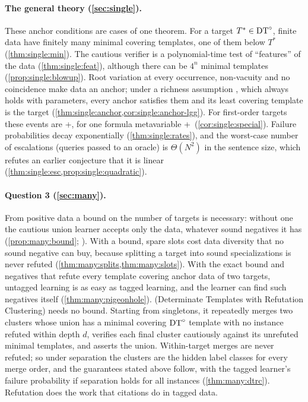 \paragraph{The general theory (\cref{sec:single}).}
These anchor conditions are cases of one theorem. For a target $T^*\in\mathrm{DT}^{\circ}$, finite data have finitely many minimal
covering templates, one of them below $T^*$ (\cref{thm:single:min}). The cautious verifier is a polynomial-time test of
``features'' of the data (\cref{thm:single:feat}), although there can be $4^n$ minimal templates
(\cref{prop:single:blowup}). Root variation at every occurrence, non-vacuity and no coincidence make data an anchor;
under a richness assumption \Rich, which always holds with parameters, every anchor satisfies them and its least
covering template is the target (\cref{thm:single:anchor,cor:single:anchor-lgg}). For first-order targets these events
are \evR+\evD, for one formula metavariable \evR+\evN\ (\cref{cor:single:special}). Failure probabilities decay
exponentially (\cref{thm:single:rates}), and the worst-case number of escalations (queries passed to an oracle) is
$\Theta(N^2)$ in the sentence size, which refutes an earlier conjecture that it is linear
(\cref{thm:single:esc,prop:single:quadratic}).

\paragraph{Question 3 (\cref{sec:many}).}
From positive data a bound on the number of targets is necessary: without one the cautious union learner accepts only
the data, whatever sound negatives it has (\cref{prop:many:bound}; \citealp{gold1967language}). With a bound, spare
slots cost data diversity that no sound negative can buy, because splitting a target into sound specializations is never
refuted (\cref{thm:many:splits,thm:many:slots}). With the exact bound and negatives that refute every template covering
anchor data of two targets, untagged learning is as easy as tagged learning, and the learner can find such negatives
itself (\cref{thm:many:pigeonhole}). \textup{\DTRC} (Determinate Templates with Refutation Clustering) needs no bound.
Starting from singletons, it repeatedly merges two clusters whose union has a minimal covering $\mathrm{DT}^{\circ}$ template with no
instance refuted within depth $d$, verifies each final cluster cautiously against its unrefuted minimal templates, and
asserts the union. Within-target merges are never refuted; so under separation the clusters are the hidden label classes
for every merge order, and the guarantees stated above follow, with the tagged learner's failure probability if
separation holds for all instances (\cref{thm:many:dtrc}). Refutation does the work that citations do in tagged data.

